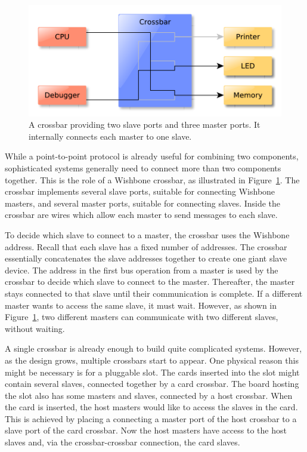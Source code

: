 \documentclass[a4paper]{jacow}
\begin{document}
\begin{figure}[t]
  \centering
  \includegraphics*[width=\columnwidth]{crossbar}
  \caption{A crossbar providing two slave ports and three
  master ports. It internally connects each master to one slave.}
  \label{fig:crossbar}
\end{figure}

While a point-to-point protocol is already useful for combining two components,
sophisticated systems generally need to connect more than two components together.
This is the role of a Wishbone crossbar, as illustrated in Figure~\ref{fig:crossbar}.
The crossbar implements several slave ports, suitable for connecting
Wishbone masters, and several master ports, suitable for connecting slaves.
Inside the crossbar are wires which allow each master to send messages to each slave.

To decide which slave to connect to a master, the crossbar uses the Wishbone address.
Recall that each slave has a fixed number of addresses.
The crossbar essentially concatenates the slave addresses together to create
one giant slave device.
The address in the first bus operation from a master is used by the crossbar
to decide which slave to connect to the master.
Thereafter, the master stays connected to that slave until their
communication is complete.
If a different master wants to access the same slave, it must wait.
However, as shown in Figure~\ref{fig:crossbar}, two different masters can
communicate with two different slaves, without waiting.

A single crossbar is already enough to build quite complicated systems.
However, as the design grows, multiple crossbars start to appear.
One physical reason this might be necessary is for a pluggable slot.
The cards inserted into the slot might contain several slaves,
connected together by a card crossbar.
The board hosting the slot also has some masters and slaves, 
connected by a host crossbar.
When the card is inserted, the host masters would like to access the slaves
in the card.
This is achieved by placing a connecting a master port of the host crossbar 
to a slave port of the card crossbar.
Now the host masters have access to the host slaves and, via the
crossbar-crossbar connection, the card slaves.
\end{document}
